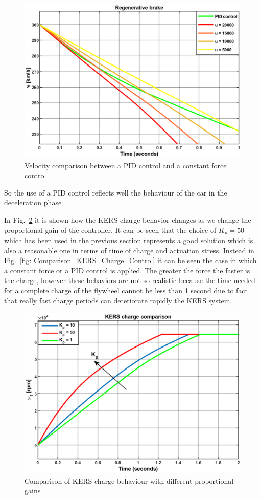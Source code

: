 \documentclass[11pt]{article}
\begin{document}
\begin{figure}[H]
\centering
\includegraphics[width=.6\textwidth]{Images/Results_Dynamics/Charge_comparison/regenerative_brake_constantforce.eps}
\caption{Velocity comparison between a PID control and a constant force control}
\label{fig: Comparison_KERS_brake_Control}
\end{figure}

So the use of a PID control reflects well the behaviour of the car in the deceleration phase. 

In Fig.~\ref{fig: Comparison_KERS_Charge_PID_Prop} it is shown how the KERS charge behavior changes as we change the proportional gain of the controller. It can be seen that the choice of $K_p = 50$ which has been used in the previous section represents a good solution which is also a reasonable one in terms of time of charge and actuation stress. Instead in Fig.~\ref{fig: Comparison_KERS_Charge_Control} it can be seen the case in which a constant force or a PID control is applied. The greater the force the faster is the charge, however these behaviors are not so realistic because the time needed for a complete charge of the flywheel cannot be less than 1 second due to fact that really fast charge periods can deteriorate rapidly the KERS system.

\begin{figure}[H]
\centering
\includegraphics[width=.6\textwidth]{Images/Results_Dynamics/Charge_comparison/kers_charge_comp_PropGain.eps}
\caption{Comparison of KERS charge behaviour with different proportional gains}
\label{fig: Comparison_KERS_Charge_PID_Prop}
\end{figure}
\end{document}
